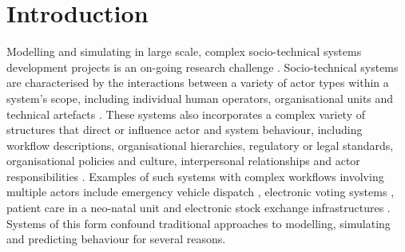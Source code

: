 \documentclass{sig-alternate}
\begin{document}

\section{Introduction}
\label{sec:introduction}


Modelling and simulating in large scale, complex socio-technical systems
development projects is an on-going research challenge \citep{baxter08learning}.
Socio-technical systems are characterised by the interactions between a variety
of actor types within a system's scope, including individual human operators,
organisational units and technical artefacts
\citep{Susman1976,elhassan07role,sommerville08socio}. These systems also
incorporates a complex variety of structures that direct or influence actor
and system behaviour, including workflow descriptions, organisational
hierarchies, regulatory or legal standards, organisational policies and culture,
interpersonal relationships and actor responsibilities
\citep{bade07structures,pentland05organisational}. Examples of such systems with
complex workflows involving multiple actors include emergency vehicle dispatch
\citep{robinson96limited}, electronic voting systems
\citep{bryans04towards,lock07observations}, patient care in a neo-natal unit
\citep{baxter07evaluating} and electronic stock exchange infrastructures
\citep{cftc-sec10findings}.  Systems of this form confound traditional
approaches to modelling, simulating and predicting behaviour for several
reasons.
\end{document}

